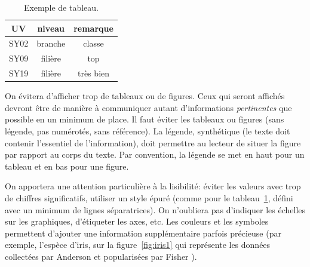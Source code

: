 \documentclass[twocolumn,10pt]{article}
\begin{document}

\begin{table}[htbp]
\begin{center}
\caption{\label{tab:exemple}Exemple de tableau.}
\begin{tabular}{ccc}
\toprule
UV & niveau & remarque \\
\midrule
SY02 & branche & classe \\
SY09 & filière & top \\
SY19 & filière & très bien \\ 
\bottomrule
\end{tabular}
\end{center}
\end{table}

On évitera d'afficher trop de tableaux ou de figures. Ceux qui seront affichés devront être  de manière à communiquer autant d'informations \emph{pertinentes} que possible en un minimum de place. Il faut éviter les tableaux ou figures  (sans légende, pas numérotés, sans référence). La légende, synthétique (le texte doit contenir l'essentiel de l'information), doit permettre au lecteur de situer la figure par rapport au corps du texte. Par convention, la légende se met en haut pour un tableau et en bas pour une figure. 

On apportera une attention particulière à la lisibilité: éviter les valeurs avec trop de chiffres significatifs, utiliser un style épuré (comme pour le tableau~\ref{tab:exemple}, défini avec un minimum de lignes séparatrices). On n'oubliera pas d'indiquer les échelles sur les graphiques, d'étiqueter les axes, etc. 
Les couleurs et les symboles permettent d'ajouter une information supplémentaire parfois précieuse (par exemple, l'espèce d'iris, sur la figure~\ref{fig:iris1} qui représente les données collectées par Anderson \cite{anderson35} et popularisées par Fisher \cite{fisher36}). 
\end{document}
